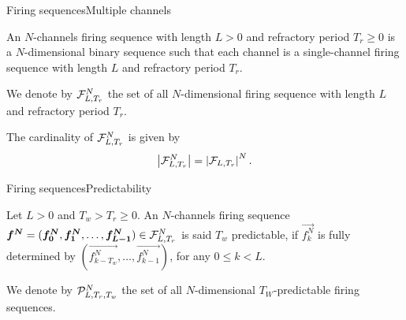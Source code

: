 \documentclass{beamer}
\begin{document}
	\begin{frame}{Firing sequences}{Multiple channels}
		\justifying
		\begin{definition}
			\justifying
			An $N$-channels firing sequence with length $L > 0$ and refractory period $T_r \geq 0$ is a $N$-dimensional binary sequence such that each channel is a single-channel firing sequence with length $L$ and refractory period $T_r$.
		  \end{definition}

		  We denote by $\mathcal{F}_{L, T_r}^N$ the set of all $N$-dimensional firing sequence with length $L$ and refractory period $T_r$.

		\begin{theorem}[Cardinality]
			\justifying
			The cardinality of $\mathcal{F}_{L, T_r}^N$ is given by 
			\begin{equation*}
				\left|{\mathcal{F}_{L, T_r}^N}\right| = \left|{\mathcal{F}_{L, T_r}}\right|^N.
			\end{equation*}
		  \end{theorem}
	\end{frame}

	\begin{frame}{Firing sequences}{Predictability}
		\justifying
		\begin{definition}
			\justifying
			Let $L > 0$ and $T_w > T_r \geq 0$. An $N$-channels firing sequence $\bm{f^N} = (\bm{f_0^N}, \bm{f_1^N}, \dots, \bm{f_{L-1}^N}) \in \mathcal{F}_{L, T_r}^N$ is said $T_w$ predictable, if $\vec{f_k^N}$ is fully determined by $(\vec{f_{k-T_w}^N}, \dots, \vec{f_{k-1}^N})$, for any $0 \leq k < L$.
		\end{definition}

		We denote by $\mathcal{P}_{L, T_r, T_w}^N$ the set of all $N$-dimensional $T_W$-predictable firing sequences.
	\end{frame}
\end{document}
